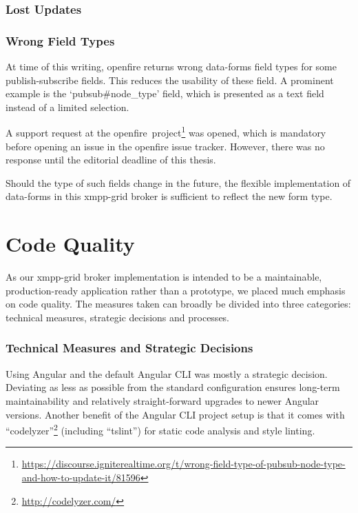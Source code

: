 \subsubsection{Lost Updates}

\subsubsection{Wrong Field Types}

At time of this writing, openfire returns wrong \gls{data-forms} field types for some \gls{publish-subscribe} fields.
 This reduces the usability of these field.
A prominent example is the `pubsub\#node\_type' field, which is presented as a text field instead of a limited selection.

A support request at the openfire~project\footnote{\url{https://discourse.igniterealtime.org/t/wrong-field-type-of-pubsub-node-type-and-how-to-update-it/81596}} was opened,
which is mandatory before opening an issue in the openfire issue tracker.
However, there was no response until the editorial deadline of this thesis.

Should the type of such fields change in the future, the flexible implementation of \gls{data-forms} in this \gls{xmpp-grid} \gls{broker} is sufficient to reflect the new form type.

\section{Code Quality}
As our \gls{xmpp-grid} \gls{broker} implementation is intended to be a maintainable, production-ready application rather than a prototype, we placed much emphasis on code quality.
The measures taken can broadly be divided into three categories: technical measures, strategic decisions and processes.

\subsubsection{Technical Measures and Strategic Decisions}
Using Angular and the default Angular CLI was mostly a strategic decision.
Deviating as less as possible from the standard configuration ensures long-term maintainability and relatively straight-forward upgrades to newer Angular versions.
Another benefit of the Angular CLI project setup is that it comes with ``codelyzer''\footnote{\url{http://codelyzer.com/}} (including ``tslint'') for static code analysis and style linting.

